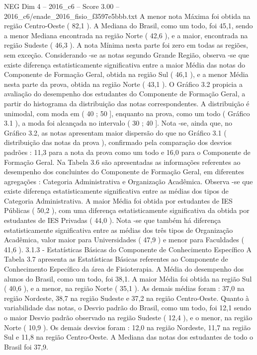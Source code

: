\begin{textsample}{NEG Dim 4 – 2016\_c6 – Score 3.00 – 2016\_c6/enade\_2016\_fisio\_f3597e5bbb.txt}
A menor nota Máxima foi obtida na região Centro-Oeste ( 82,1 ).
A Mediana do Brasil, como um todo, foi 45,1, sendo a menor Mediana encontrada na região Norte ( 42,6 ), e a maior, encontrada na região Sudeste ( 46,3 ).
A nota Mínima nesta parte foi zero em todas as regiões, sem exceção.
Considerando -se as notas segundo Grande Região, observa -se que existe diferença estatisticamente significativa entre a maior Média das notas do Componente de Formação Geral, obtida na região Sul ( 46,1 ), e a menor Média nesta parte da prova, obtida na região Norte ( 43,1 ).
O Gráfico 3.2 propicia a avaliação do desempenho dos estudantes do Componente de Formação Geral, a partir do histograma da distribuição das notas correspondentes.
A distribuição é unimodal, com moda em ( 40 ; 50 ], enquanto na prova, como um todo ( Gráfico 3.1 ), a moda foi alcançada no intervalo ( 30 ; 40 ].
Nota -se, ainda que, no Gráfico 3.2, as notas apresentam maior dispersão do que no Gráfico 3.1 ( distribuição das notas da prova ), confirmado pela comparação dos desvios padrões : 11,3 para a nota da prova como um todo e 16,0 para o Componente de Formação Geral.
Na Tabela 3.6 são apresentadas as informações referentes ao desempenho dos concluintes do Componente de Formação Geral, em diferentes agregações : Categoria Administrativa e Organização Acadêmica.
Observa -se que existe diferença estatisticamente significativa entre as médias dos tipos de Categoria Administrativa.
A maior Média foi obtida por estudantes de IES Públicas ( 50,2 ), com uma diferença estatisticamente significativa da obtida por estudantes de IES Privadas ( 44,0 ).
Nota -se que também há diferença estatisticamente significativa entre as médias dos três tipos de Organização Acadêmica, valor maior para Universidades ( 47,9 ) e menor para Faculdades ( 41,6 ). 3.1.3 - Estatísticas Básicas do Componente de Conhecimento Específico A Tabela 3.7 apresenta as Estatísticas Básicas referentes ao Componente de Conhecimento Específico da área de Fisioterapia.
A Média do desempenho dos alunos do Brasil, como um todo, foi 38,1.
A maior Média foi obtida na região Sul ( 40,6 ), e a menor, na região Norte ( 35,1 ).
As demais médias foram : 37,0 na região Nordeste, 38,7 na região Sudeste e 37,2 na região Centro-Oeste.
Quanto à variabilidade das notas, o Desvio padrão do Brasil, como um todo, foi 12,1 sendo o maior Desvio padrão observado na região Sudeste ( 12,4 ), e o menor, na região Norte ( 10,9 ).
Os demais desvios foram : 12,0 na região Nordeste, 11,7 na região Sul e 11,8 na região Centro-Oeste.
A Mediana das notas dos estudantes de todo o Brasil foi 37,9.

\end{textsample}
